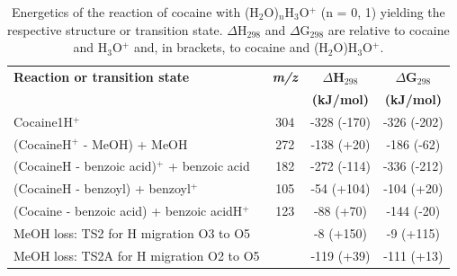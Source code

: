 \begin{table}[htbp]
\centering
\caption{Energetics of the reaction of cocaine with (H$_2$O)$_n$H$_3$O$^+$ (n = 0, 1) yielding the respective structure or transition state. $\Delta$H$_{298}$ and $\Delta$G$_{298}$ are relative to cocaine and H$_3$O$^+$ and, in brackets, to cocaine and (H$_2$O)H$_3$O$^+$.}
\label{tb:co2}
\begin{tabular}{lccc}
\toprule
\textbf{Reaction or transition state}	&\textbf{\textit{m/z} } &\textbf{$\Delta$H$_{298}$} &\textbf{$\Delta$G$_{298}$}\\
& &	\textbf{(kJ/mol)} &\textbf{(kJ/mol)} \\  \toprule
Cocaine1H$^+$  				&	304	& -328 (-170)  & -326 (-202)   \\ \midrule
(CocaineH$^+$ - MeOH) + MeOH   			&	272	& -138 (+20)	&-186 (-62)   \\ \midrule
(CocaineH - benzoic acid)$^+$ + benzoic acid &	182 & -272 (-114)  & -336 (-212)  \\ \midrule
(CocaineH - benzoyl) + benzoyl$^+$    	&	105	& -54 (+104)  & -104 (+20)  \\ \midrule
(Cocaine - benzoic acid) + benzoic acidH$^+$& 123	& -88 (+70)  & -144  (-20) \\ \midrule
MeOH loss: TS2 for H migration O3 to O5& & -8 (+150)  & -9 (+115)  \\ \midrule
MeOH loss: TS2A for H migration O2 to O5& & -119 (+39)  & -111  (+13) \\ 
\bottomrule
\end{tabular}
\end{table}


